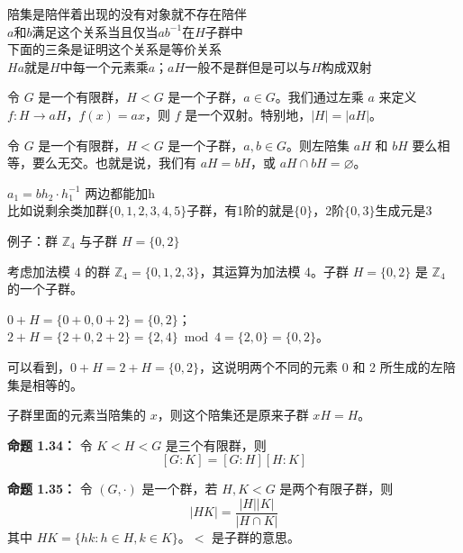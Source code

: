 \begin{note}[右陪集的定义]
陪集是陪伴着出现的没有对象就不存在陪伴 \\
$a$和$b$满足这个关系当且仅当$ab^{-1}$在$H$子群中 \\
下面的三条是证明这个关系是等价关系 \\
$Ha$就是$H$中每一个元素乘$a$；$aH$一般不是群但是可以与$H$构成双射
\end{note}

\begin{lemma}[引理 1.2]
令 $G$ 是一个有限群，$H<G$ 是一个子群，$a\in G$。我们通过左乘 $a$ 来定义 $f:H\to aH$，$f(x)=ax$，则 $f$ 是一个双射。特别地，$|H|=|aH|$。
\end{lemma}

\begin{proposition}[命题 1.33：陪集要不然相等要不然无交]
令 $G$ 是一个有限群，$H<G$ 是一个子群，$a,b\in G$。则左陪集 $aH$ 和 $bH$ 要么相等，要么无交。也就是说，我们有 $aH=bH$，或 $aH\cap bH=\varnothing$。
\end{proposition}

\begin{note}[命题1 3 3子群陪集要不然相等要不然无交]
$a_1=bh_2\cdot h_1^{-1}$ 两边都能加h \\
比如说剩余类加群$\{0,1,2,3,4,5\}$子群，有1阶的就是$\{0\}$，2阶$\{0,3\}$生成元是3
\end{note}

\begin{example}
例子：群 $\mathbb{Z}_4$ 与子群 $H=\{0,2\}$

考虑加法模 4 的群 $\mathbb{Z}_4=\{0,1,2,3\}$，其运算为加法模 4。子群 $H=\{0,2\}$ 是 $\mathbb{Z}_4$ 的一个子群。

$0+H=\{0+0,0+2\}=\{0,2\}$；$2+H=\{2+0,2+2\}=\{2,4\}\bmod 4=\{2,0\}=\{0,2\}$。

可以看到，$0+H=2+H=\{0,2\}$，这说明两个不同的元素 0 和 2 所生成的左陪集是相等的。
\end{example}

\begin{note}[子群里面的元素当陪集的 $x$，则这个陪集还是原来子群 $xH=H$]
子群里面的元素当陪集的 $x$，则这个陪集还是原来子群 $xH=H$。
\end{note}

\begin{proposition}[命题 1.34、1.35：嵌套子群的陪集]
\textbf{命题 1.34：} 令 $K<H<G$ 是三个有限群，则
\[
[G:K]=[G:H][H:K]
\]

\textbf{命题 1.35：} 令 $(G,\cdot)$ 是一个群，若 $H,K<G$ 是两个有限子群，则
\[
|HK|=\frac{|H||K|}{|H\cap K|}
\]
其中 $HK=\{hk:h\in H,k\in K\}$。$<$ 是子群的意思。
\end{proposition}

